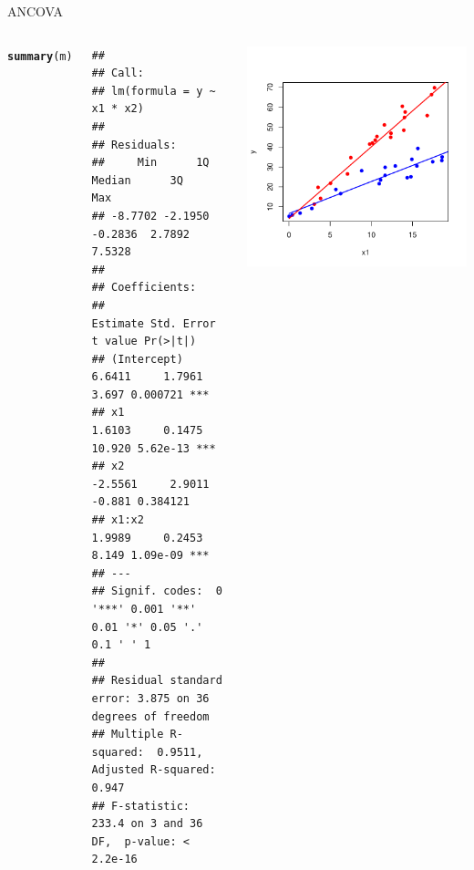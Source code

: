 \documentclass{beamer}\usepackage[]{graphicx}\usepackage[]{color}
\makeatletter
\newcommand{\hlstd}[1]{\textcolor[rgb]{0.345,0.345,0.345}{#1}}%
\newcommand{\hlkwd}[1]{\textcolor[rgb]{0.737,0.353,0.396}{\textbf{#1}}}%
\newenvironment{kframe}{%
 \def\at@end@of@kframe{}%
 \ifinner\ifhmode%
  \def\at@end@of@kframe{\end{minipage}}%
  \begin{minipage}{\columnwidth}%
 \fi\fi%
 \def\FrameCommand##1{\hskip\@totalleftmargin \hskip-\fboxsep
 \colorbox{shadecolor}{##1}\hskip-\fboxsep
     \hskip-\linewidth \hskip-\@totalleftmargin \hskip\columnwidth}%
 \MakeFramed {\advance\hsize-\width
   \@totalleftmargin\z@ \linewidth\hsize
   \@setminipage}}%
 {\par\unskip\endMakeFramed%
 \at@end@of@kframe}
\newenvironment{knitrout}{}{} %
\renewenvironment{knitrout}{\setlength{\topsep}{0mm}}{}
\makeatother
\begin{document}
\begin{frame}[fragile]{ANCOVA}

\begin{columns}

\setlength{\topsep}{2pt}
\begin{knitrout}\tiny
{}\color{fgcolor}\begin{kframe}
\begin{alltt}
\hlkwd{summary}\hlstd{(m)}
\end{alltt}
\begin{verbatim}
## 
## Call:
## lm(formula = y ~ x1 * x2)
## 
## Residuals:
##     Min      1Q  Median      3Q     Max 
## -8.7702 -2.1950 -0.2836  2.7892  7.5328 
## 
## Coefficients:
##             Estimate Std. Error t value Pr(>|t|)    
## (Intercept)   6.6411     1.7961   3.697 0.000721 ***
## x1            1.6103     0.1475  10.920 5.62e-13 ***
## x2           -2.5561     2.9011  -0.881 0.384121    
## x1:x2         1.9989     0.2453   8.149 1.09e-09 ***
## ---
## Signif. codes:  0 '***' 0.001 '**' 0.01 '*' 0.05 '.' 0.1 ' ' 1
## 
## Residual standard error: 3.875 on 36 degrees of freedom
## Multiple R-squared:  0.9511,	Adjusted R-squared:  0.947 
## F-statistic: 233.4 on 3 and 36 DF,  p-value: < 2.2e-16
\end{verbatim}
\end{kframe}
\end{knitrout}


\begin{knitrout}
\color{fgcolor}
\includegraphics[width=1.1\linewidth]{figure/ancovplot4-1} 

\end{knitrout}


\end{columns}

\end{frame}
\end{document}
